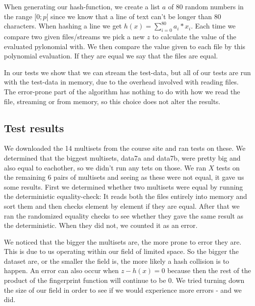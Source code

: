 \documentclass[article,a4paper,oneside]{article}
\newcommand{\+}[1]{\ensuremath{\boldsymbol{#1}}}
\begin{document}
When generating our hash-function, we create a list $a$ of 80 random numbers in the range $[0;p[$ since we know that a line of text can't be longer than 80 characters. When hashing a line we get $h(x) = \sum_{i=0}^{80}a_i*x_i $. Each time we compare two given files/streams we pick a new $z$ to calculate the value of the evaluated pylonomial with. We then compare the value given to each file by this polynomial evaluation. If they are equal we say that the files are equal.

	In our tests we show that we can stream the test-data, but all of our tests are run with the test-data in memory, due to the overhead involved with reading files. The error-prone part of the algorithm has nothing to do with how we read the file, streaming or from memory, so this choice does not alter the results. 

\subsection*{Test results}

We downloaded the 14 multisets from the course site and ran tests on these. We determined that the biggest multisets, data7a and data7b, were pretty big and also equal to eachother, so we didn't run any tets on those. We ran $X$  tests on the remaining 6 pairs of multisets and seeing as these were not equal, it gave us some results. First we determined whether two multisets were equal by running the deterministic equality-check: It reads both the files entirely into memory and sort them and then checks element by element if they are equal. After that we ran the randomized equality checks to see whether they gave the same result as the deterministic. When they did not, we counted it as an error.

We noticed that the bigger the multisets are, the more prone to error they are. This is due to us operating within our field of limited space. So the bigger the dataset are, or the smaller the field is, the more likely a hash collision is to happen. An error can also occur when $z-h(x)=0$ because then the rest of the product of the fingerprint function will continue to be $0$. We tried turning down the size of our field in order to see if we would experience more errors - and we did.

\end{document}
